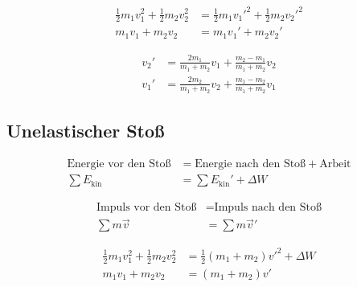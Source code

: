 \begin{boxleft}
\end{boxleft}\begin{boxrightshaded}
\begin{align}
\frac{1}{2}m_1v_1^2+\frac{1}{2}m_2v_2^2&=\frac{1}{2}m_1v_1'^2+\frac{1}{2}m_2v_2'^2\\
m_1v_1+m_2v_2&=m_1v_1'+m_2v_2'
\end{align}
\end{boxrightshaded}

\begin{boxleft}
\end{boxleft}\begin{boxrightshaded}
\begin{align}
v_2'&=\frac{2m_1}{m_1+m_2}v_1+\frac{m_2-m_1}{m_1+m_2}v_2\\
v_1'&=\frac{2m_2}{m_1+m_2}v_2+\frac{m_1-m_2}{m_1+m_2}v_1
\end{align}
\end{boxrightshaded}

\subsection{Unelastischer Stoß}

\begin{boxleft}
\end{boxleft}\begin{boxrightshaded}
\begin{align}
\text{Energie vor den Stoß} &= \text{Energie nach den Stoß}+\text{Arbeit}\nonumber\\
\sum E_{\text{kin}}&=\sum E_{\text{kin}}'+\Delta W
\end{align}
\end{boxrightshaded}

\begin{boxleft}
\end{boxleft}\begin{boxrightshaded}
\begin{align}
\text{Impuls vor den Stoß} &= \text{Impuls nach den Stoß}\nonumber\\
\sum m\vec{v}&= \sum m\vec{v}'
\end{align}
\end{boxrightshaded}

\begin{boxleft}
\end{boxleft}\begin{boxrightshaded}
\begin{align}
\frac{1}{2}m_1v_1^2+\frac{1}{2}m_2v_2^2&=\frac{1}{2}\left(m_1+m_2\right)v'^2+\Delta W\\
m_1v_1+m_2v_2&=\left(m_1+m_2\right)v'
\end{align}
\end{boxrightshaded}


